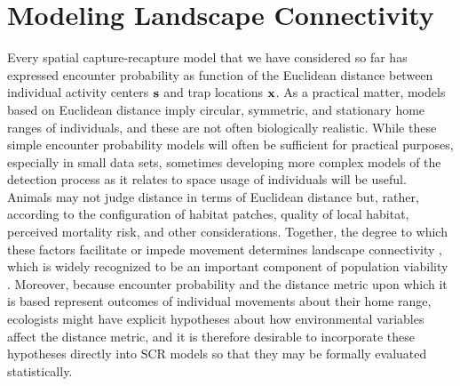 \chapter{
Modeling Landscape Connectivity
}
\label{chapt.ecoldist}


\vspace{.3in}


Every spatial capture-recapture model that we have considered so far
has expressed encounter probability as function of the Euclidean
distance between individual activity centers ${\bf s}$ and trap
locations ${\bf x}$.  As a practical matter, models based on Euclidean
distance imply circular, symmetric, and stationary home ranges of
individuals, and these are not often biologically realistic.  While
these simple encounter probability models will often be sufficient for
practical purposes, especially in small data sets, sometimes
developing more complex models of the detection process as it relates
to space usage of individuals will be useful.  Animals may not judge
distance in terms of Euclidean distance but, rather, according to
the configuration of habitat patches, quality of local habitat, %
perceived mortality
risk, and other considerations. %
Together, the degree to which these factors facilitate or impede
movement determines landscape connectivity
\citep{tischendorf_fahrig:2000}, which is widely recognized to be an
important component of population viability
\citep{with_crist:1995}.
Moreover, because encounter probability and the distance metric upon which it is
based represent outcomes of individual movements about their home
range, ecologists might have explicit hypotheses about how
environmental variables affect the distance metric, and it is
therefore desirable to incorporate these hypotheses directly into SCR
models so that they may be formally evaluated statistically.

